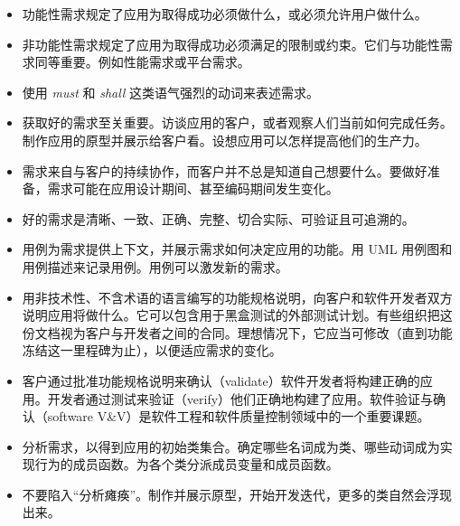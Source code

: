 \begin{itemize}
\item 功能性需求规定了应用为取得成功必须做什么，或必须允许用户做什么。
\item 非功能性需求规定了应用为取得成功必须满足的限制或约束。它们与功能性需求同等重要。例如性能需求或平台需求。
\item 使用 \emph{must} 和 \emph{shall} 这类语气强烈的动词来表述需求。
\item 获取好的需求至关重要。访谈应用的客户，或者观察人们当前如何完成任务。制作应用的原型并展示给客户看。设想应用可以怎样提高他们的生产力。
\item 需求来自与客户的持续协作，而客户并不总是知道自己想要什么。要做好准备，需求可能在应用设计期间、甚至编码期间发生变化。
\item 好的需求是清晰、一致、正确、完整、切合实际、可验证且可追溯的。
\item 用例为需求提供上下文，并展示需求如何决定应用的功能。用 UML 用例图和用例描述来记录用例。用例可以激发新的需求。
\item 用非技术性、不含术语的语言编写的功能规格说明，向客户和软件开发者双方说明应用将做什么。它可以包含用于黑盒测试的外部测试计划。有些组织把这份文档视为客户与开发者之间的合同。理想情况下，它应当可修改（直到功能冻结这一里程碑为止），以便适应需求的变化。
\item 客户通过批准功能规格说明来确认（validate）软件开发者将构建正确的应用。开发者通过测试来验证（verify）他们正确地构建了应用。软件验证与确认（software V\&V）是软件工程和软件质量控制领域中的一个重要课题。
\item 分析需求，以得到应用的初始类集合。确定哪些名词成为类、哪些动词成为实现行为的成员函数。为各个类分派成员变量和成员函数。
\item 不要陷入“分析瘫痪”。制作并展示原型，开始开发迭代，更多的类自然会浮现出来。
\end{itemize}
